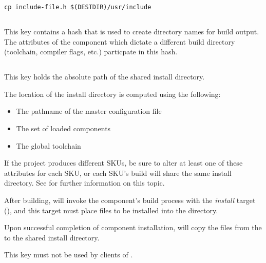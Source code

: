 \begin{verbatim}
cp include-file.h $(DESTDIR)/usr/include
\end{verbatim}


\subsection{}\label{variables:hash}

This key contains a hash that is used to create directory names for
build output.  The attributes of the component which dictate a
different build directory (toolchain, compiler flags, etc.) particpate
in this hash.

\subsection{}\label{variables:install-directory}

This key holds the absolute path of the shared install directory.

The location of the install directory is computed using the following:

\begin{itemize}
\item{The pathname of the master configuration file}
\item{The set of loaded components}
\item{The global toolchain}
\end{itemize}

If the project produces different SKUs, be sure to alter at least one
of these attributes for each SKU, or each SKU's build will share the
same install directory.  See  for further
information on this topic.

After building, \lmsbw will invoke the component's build process with
the \emph{install} target (), and this
target must place files to be installed into the \destdir directory.

Upon successful completion of component installation, \lmsbw will copy
the files from the \destdir to the shared install directory.

This key must not be used by clients of \lmsbw.


\subsection{}\label{variables:install-target}

